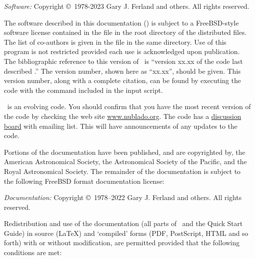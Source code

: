 {\small
\noindent
{\em Software:} Copyright \copyright\ 1978-2023 Gary J. Ferland and others. All rights reserved.

\vspace{1em}

\noindent
The software described in this documentation (\Cloudy) is subject
to a FreeBSD-style software license
contained in the file  in the
root directory of the distributed files.
The list of co-authors is given in the file
 in the same directory.
Use of this program is not restricted provided each use is
acknowledged upon publication.
The bibliographic reference to this version of \Cloudy\ is
``version xx.xx
of the code last described \citet{CloudyReview}.''
The version number, shown here as ``xx.xx'', should be
given.
This version number, along with a complete citation,
can be found by executing the code with the 
 command included in the input script.

\vspace{1em}

\noindent
\Cloudy\ is an evolving code.
You should confirm that you have the most recent
version of the code by checking the web site
\href{http://www.nublado.org}{www.nublado.org}.
The code has a
\href{https://cloudyastrophysics.groups.io}{discussion board} with emailing list.
This will have announcements of any updates to the code.\par

\vspace{1em}

\noindent
Portions of the documentation have been published, and are copyrighted by, the
American Astronomical Society, the Astronomical Society of the Pacific, and
the Royal Astronomical Society. The remainder of the documentation is subject
to the following FreeBSD format documentation license:

\vspace{1em}

\noindent
{\em Documentation:} Copyright \copyright\ 1978--2022 Gary J. Ferland and others. All rights reserved.

\vspace{1em}

\noindent
Redistribution and use of the documentation (all parts of \Hazy\ and the
Quick Start Guide) in source (\LaTeX) and `compiled' forms (PDF, PostScript,
HTML and so forth) with or without modification, are permitted provided that
the following conditions are met:

}
